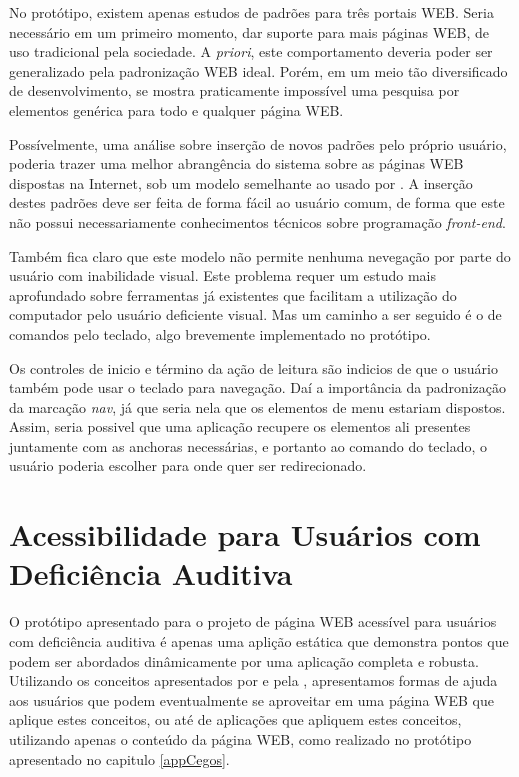 \documentclass[
	12pt,				%
	oneside,			%
	a4paper,			%
	english,			%
	brazil				%
	]{abntex2ppgsi}
\begin{document}
No protótipo, existem apenas estudos de padrões para três portais WEB. Seria necessário em um primeiro momento, dar suporte para mais páginas WEB, de uso tradicional pela sociedade. A \textit{priori}, este comportamento deveria poder ser generalizado pela padronização WEB ideal. Porém, em um meio tão diversificado de desenvolvimento, se mostra praticamente impossível uma pesquisa por elementos genérica para todo e qualquer página WEB. 

Possívelmente, uma análise sobre inserção de novos padrões pelo próprio usuário, poderia trazer uma melhor abrangência do sistema sobre as páginas WEB dispostas na Internet, sob um modelo semelhante ao usado por . A inserção destes padrões deve ser feita de forma fácil ao usuário comum, de forma que este não possui necessariamente conhecimentos técnicos sobre programação \textit{front-end}.

Também fica claro que este modelo não permite nenhuma nevegação por parte do usuário com inabilidade visual. Este problema requer um estudo mais aprofundado sobre ferramentas já existentes que facilitam a utilização do computador pelo usuário deficiente visual. Mas um caminho a ser seguido é o de comandos pelo teclado, algo brevemente implementado no protótipo.

Os controles de inicio e término da ação de leitura são indicios de que o usuário também pode usar o teclado para navegação. Daí a importância da padronização da marcação \textit{nav}, já que seria nela que os elementos de menu estariam dispostos. Assim, seria possivel que uma aplicação recupere os elementos ali presentes juntamente com as anchoras necessárias, e portanto ao comando do teclado, o usuário poderia escolher para onde quer ser redirecionado. 

\chapter{Acessibilidade para Usuários com Deficiência Auditiva}

O protótipo apresentado para o projeto de página WEB acessível para usuários com deficiência auditiva é apenas uma aplição estática que demonstra pontos que podem ser abordados dinâmicamente por uma aplicação completa e robusta. Utilizando os conceitos apresentados por  e pela , apresentamos formas de ajuda aos usuários que podem eventualmente se aproveitar em uma página WEB que aplique estes conceitos, ou até de aplicações que apliquem estes conceitos, utilizando apenas o conteúdo da página WEB, como realizado no protótipo apresentado no capitulo \ref{appCegos}.
\end{document}
